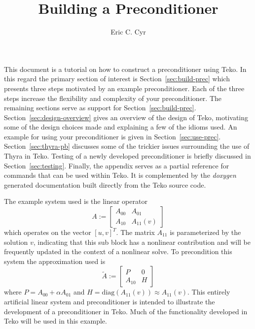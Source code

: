 \documentclass[12pt]{article}
\title{Building a Preconditioner}
\author{Eric C. Cyr}
\newcommand{\diag}[1]{\ensuremath{\mbox{diag}(#1)}}
\begin{document}
\maketitle


This document is a tutorial on how to construct a 
preconditioner using Teko. In this regard the primary
section of interest is Section~\ref{sec:build-prec}
which presents three steps motivated by an example
preconditioner. Each of the three steps increase
the flexibility and complexity of your preconditioner.
The remaining sections serve as support for Section~\ref{sec:build-prec}.
Section~\ref{sec:design-overview} gives an overview of
the design of Teko, motivating some of the design choices made
and explaining a few of the idioms used. An example for using
your preconditioner is given in Section~\ref{sec:use-prec}.
Section~\ref{sec:thyra-pb}
discusses some of the trickier issues surrounding the use
of Thyra in Teko.  Testing of a newly developed preconditioner
is briefly discussed in Section~\ref{sec:testing}.
Finally, the appendix serves
as a partial reference for commands that can be used
within Teko. It is complemented by the \emph{doxygen}
generated documentation built directly from the Teko
source code.

The example system used is the linear operator
\begin{equation}
A :=  
\begin{bmatrix}
A_{00} & A_{01} \\
A_{10} & A_{11}(v)
\end{bmatrix}
\end{equation}
which operates on the vector $[u,v]^{T}$. The matrix $A_{11}$ 
is parameterized by the solution $v$, indicating that this sub block
has a nonlinear contribution and will be frequently updated in the
context of a nonlinear solve. To precondition this system the
approximation used is
\begin{equation}
\tilde{A} :=  
\begin{bmatrix}
P & 0 \\
A_{10} & H
\end{bmatrix}
\end{equation}
where $P = A_{00} + \alpha A_{01}$ and $H = \diag{A_{11}(v)} \approx A_{11}(v)$. This
entirely artificial linear system and preconditioner is
intended to illustrate the development of a preconditioner
in Teko. Much of the functionality developed in Teko will be used
in this example.
\end{document}
